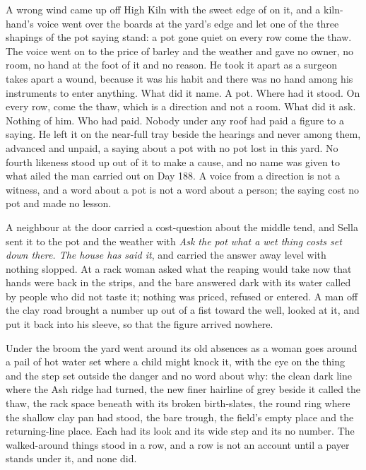 A wrong wind came up off High Kiln with the sweet edge of  on it, and a kiln-hand's voice went over the boards at the yard's edge and let one of the three shapings of the pot saying stand: a pot gone quiet on every row come the thaw. The voice went on to the price of barley and the weather and gave no owner, no room, no hand at the foot of it and no reason. He took it apart as a surgeon takes apart a wound, because it was his habit and there was no hand among his instruments to enter anything. What did it name. A pot. Where had it stood. On every row, come the thaw, which is a direction and not a room. What did it ask. Nothing of him. Who had paid. Nobody under any roof had paid a figure to a saying. He left it on the near-full tray beside the hearings and never among them, advanced and unpaid, a saying about a pot with no pot lost in this yard. No fourth likeness stood up out of it to make a cause, and no name was given to what ailed the man carried out on Day 188. A voice from a direction is not a witness, and a word about a pot is not a word about a person; the saying cost no pot and made no lesson.

\scenebreak

A neighbour at the door carried a cost-question about the middle tend, and Sella sent it to the pot and the weather with \emph{Ask the pot what a wet thing costs set down there. The house has said it}, and carried the answer away level with nothing slopped. At  a rack woman asked what the reaping would take now that hands were back in the strips, and the bare  answered dark with its water called  by people who did not taste it; nothing was priced, refused or entered. A man off the clay road brought a number up out of a fist toward the well, looked at it, and put it back into his sleeve, so that the figure arrived nowhere.

Under the broom the yard went around its old absences as a woman goes around a pail of hot water set where a child might knock it, with the eye on the thing and the step set outside the danger and no word about why: the clean dark line where the Ash ridge had turned, the new finer hairline of grey beside it called the thaw, the rack space beneath  with its broken birth-slates, the round ring where the shallow clay pan had stood, the bare trough, the field's empty place and the returning-line place. Each had its look and its wide step and its no number. The walked-around things stood in a row, and a row is not an account until a payer stands under it, and none did.

